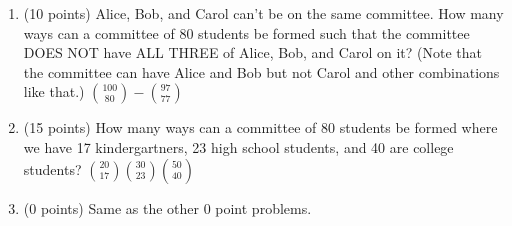 \documentclass[12pt]{article}
\begin{document}
\begin{enumerate}
\begin{enumerate}
\item
(10 points)
Alice, Bob, and Carol can't be on the same committee.
How many ways can a committee of 80 students be formed such that
the committee DOES NOT have ALL THREE of Alice, Bob, and Carol on it?
(Note that the committee can have Alice and Bob but not Carol and other
combinations like that.) 
\textbf{${100 \choose 80} - {97 \choose 77}$}

\item
(15 points) 
How many ways can a committee of 80 students be formed where
we have 17 kindergartners, 23 high school students, and 40 are college students? 
\textbf{${20 \choose 17} {30 \choose 23} {50 \choose 40}$}

\item
(0 points) Same as the other 0 point problems. 
\end{enumerate}

\end{enumerate}
\end{document}
